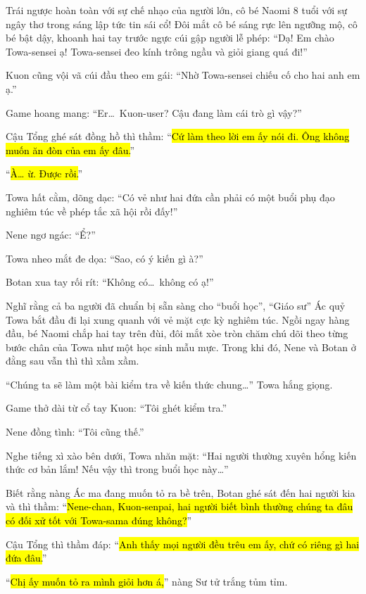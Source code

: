 \documentclass[../main.tex]{subfiles}
\begin{document}
Trái ngược hoàn toàn với sự chế nhạo của người lớn, cô bé Naomi 8 tuổi với sự ngây thơ trong sáng lập tức tin sái cổ! Đôi mắt cô bé sáng rực lên ngưỡng mộ, cô bé bật dậy, khoanh hai tay trước ngực cúi gập người lễ phép: ``Dạ! Em chào Towa-sensei ạ! Towa-sensei đeo kính trông ngầu và giỏi giang quá đi!''

Kuon cũng vội vã cúi đầu theo em gái: ``Nhờ Towa-sensei chiếu cố cho hai anh em ạ.''

Game hoang mang: ``Er\dots\ Kuon-user? Cậu đang làm cái trò gì vậy?''

Cậu Tổng ghé sát đồng hồ thì thầm: ``\hl{Cứ làm theo lời em ấy nói đi. Ông không muốn ăn đòn của em ấy đâu.}''

``\hl{À\dots{} ừ. Được rồi.}''

Towa hất cằm, dõng dạc: ``Có vẻ như hai đứa cần phải có một buổi phụ đạo nghiêm túc về phép tắc xã hội rồi đấy!''

Nene ngơ ngác: ``Ể?''

Towa nheo mắt đe dọa: ``Sao, có ý kiến gì à?''

Botan xua tay rối rít: ``Không có\dots\ không có ạ!''

\ct

Nghĩ rằng cả ba người đã chuẩn bị sẵn sàng cho ``buổi học'', ``Giáo sư'' Ác quỷ Towa bắt đầu đi lại xung quanh với vẻ mặt cực kỳ nghiêm túc. Ngồi ngay hàng đầu, bé Naomi chắp hai tay trên đùi, đôi mắt xòe tròn chăm chú dõi theo từng bước chân của Towa như một học sinh mẫu mực. Trong khi đó, Nene và Botan ở đằng sau vẫn thì thì xầm xầm.


``Chúng ta sẽ làm một bài kiểm tra về kiến thức chung\dots'' Towa hắng giọng.

Game thở dài từ cổ tay Kuon: ``Tôi ghét kiểm tra.''

Nene đồng tình: ``Tôi cũng thế.''

Nghe tiếng xì xào bên dưới, Towa nhăn mặt: ``Hai người thường xuyên hổng kiến thức cơ bản lắm! Nếu vậy thì trong buổi học này\dots''

Biết rằng nàng Ác ma đang muốn tỏ ra bề trên, Botan ghé sát đến hai người kia và thì thầm: ``\hl{Nene-chan, Kuon-senpai, hai người biết bình thường chúng ta đâu có đối xử tốt với Towa-sama đúng không?}''

Cậu Tổng thì thầm đáp: ``\hl{Anh thấy mọi người đều trêu em ấy, chứ có riêng gì hai đứa đâu.}''

``\hl{Chị ấy muốn tỏ ra mình giỏi hơn á,}'' nàng Sư tử trắng tủm tỉm.
\end{document}
